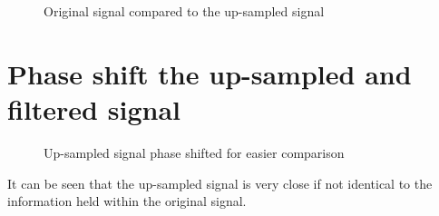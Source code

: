 \documentclass[a4paper,11pt]{article}
\begin{document}
\begin{figure}[h]
 \begin{center}
  \caption{Original signal compared to the up-sampled signal}
  \vspace{-30pt}
 \end{center}
\end{figure}

\section{Phase shift the up-sampled and filtered signal}

\begin{figure}[h]
 \begin{center}
  \caption{Up-sampled signal phase shifted for easier comparison}
    \vspace{-80pt}
 \end{center}
\end{figure}
\vspace{60pt}

It can be seen that the up-sampled signal is very close if not identical to the information held within the original signal. 

\pagebreak


\end{document}
